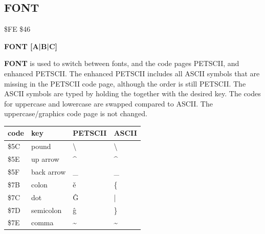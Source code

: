 \subsection{FONT}
\begin{description}[leftmargin=2cm,style=nextline]
\item [Token:] \$FE \$46
\item [Format:] {\bf FONT [A|B|C]}
\item [Usage:] {\bf FONT} is used to switch between fonts,
               and the code pages PETSCII, and enhanced PETSCII.
               The enhanced PETSCII includes all ASCII symbols that
               are missing in the PETSCII code page, although the order
               is still PETSCII.
               The ASCII symbols are typed by holding the \megasymbolkey
               together with the desired key.
               The codes for uppercase and lowercase
               are swapped compared to ASCII.
               The uppercase/graphics code page is not changed.
\begin{center}
\ttfamily
{\setlength{\tabcolsep}{1mm}
\begin{tabular}{*{4}{|R{2.0cm}}|}
\hline
 code  &   key & PETSCII & ASCII  \\
\hline
\$5C & pound      & {\codefont \textbackslash}   & \textbackslash  \\
\$5E & up arrow   & {\codefont \textasciicircum} & \textasciicircum  \\
\$5F & back arrow & {\codefont \_}               & \_   \\
\$7B & colon      & {\codefont ě }               & \{   \\
\$7C & dot        & {\codefont Ĝ }               &  |   \\
\$7D & semicolon  & {\codefont ĝ }               & \}   \\
\$7E & comma      & {\codefont \textasciitilde}  & \textasciitilde   \\
\hline
\end{tabular}
}
\end{center}

%
%
%



\end{description}
